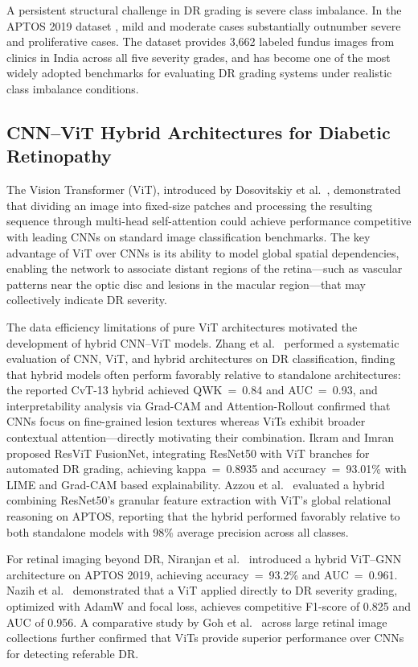 \documentclass[a4paper,fleqn]{cas-dc}
\begin{document}
A persistent structural challenge in DR grading is severe class imbalance. In the APTOS 2019 dataset \cite{aptos2019}, mild and moderate cases substantially outnumber severe and proliferative cases. The dataset provides 3,662 labeled fundus images from clinics in India across all five severity grades, and has become one of the most widely adopted benchmarks for evaluating DR grading systems under realistic class imbalance conditions.

\subsection{CNN--ViT Hybrid Architectures for Diabetic Retinopathy}

The Vision Transformer (ViT), introduced by Dosovitskiy et al.\ \cite{dosovitskiy2021}, demonstrated that dividing an image into fixed-size patches and processing the resulting sequence through multi-head self-attention could achieve performance competitive with leading CNNs on standard image classification benchmarks. The key advantage of ViT over CNNs is its ability to model global spatial dependencies, enabling the network to associate distant regions of the retina---such as vascular patterns near the optic disc and lesions in the macular region---that may collectively indicate DR severity.

The data efficiency limitations of pure ViT architectures motivated the development of hybrid CNN--ViT models. Zhang et al.\ \cite{zhang2025} performed a systematic evaluation of CNN, ViT, and hybrid architectures on DR classification, finding that hybrid models often perform favorably relative to standalone architectures: the reported CvT-13 hybrid achieved QWK~=~0.84 and AUC~=~0.93, and interpretability analysis via Grad-CAM and Attention-Rollout confirmed that CNNs focus on fine-grained lesion textures whereas ViTs exhibit broader contextual attention---directly motivating their combination. Ikram and Imran \cite{ikram2025} proposed ResViT FusionNet, integrating ResNet50 with ViT branches for automated DR grading, achieving kappa~=~0.8935 and accuracy~=~93.01\% with LIME and Grad-CAM based explainability. Azzou et al.\ \cite{azzou2025} evaluated a hybrid combining ResNet50's granular feature extraction with ViT's global relational reasoning on APTOS, reporting that the hybrid performed favorably relative to both standalone models with 98\% average precision across all classes.

For retinal imaging beyond DR, Niranjan et al.\ \cite{niranjan2025} introduced a hybrid ViT--GNN architecture on APTOS 2019, achieving accuracy~=~93.2\% and AUC~=~0.961. Nazih et al.\ \cite{nazih2023} demonstrated that a ViT applied directly to DR severity grading, optimized with AdamW and focal loss, achieves competitive F1-score of 0.825 and AUC of 0.956. A comparative study by Goh et al.\ \cite{goh2024} across large retinal image collections further confirmed that ViTs provide superior performance over CNNs for detecting referable DR.
\end{document}

